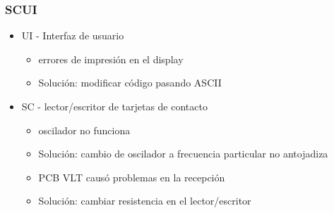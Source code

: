 \documentclass{beamer}
\begin{document}
\begin{frame}
	\frametitle{SCUI}
	\begin{itemize}
		\item UI - Interfaz de usuario
		\begin{itemize}		
			\item errores de impresión en el display
			\item[ ] Solución: modificar código pasando ASCII
	\end{itemize}

	\bigskip
	\item SC - lector/escritor de tarjetas de contacto
		\begin{itemize}
			\item oscilador no funciona
			\item[ ] Solución: cambio de oscilador a frecuencia particular no antojadiza

			\bigskip
			\item PCB VLT causó problemas en la recepción
			\item[ ] Solución: cambiar resistencia en el lector/escritor
		\end{itemize}	
	\end{itemize}
\end{frame}
\end{document}

